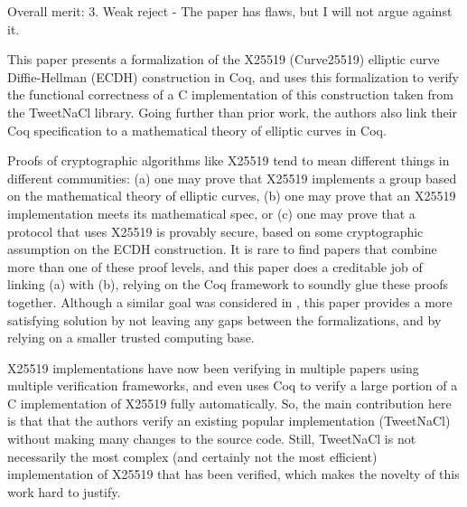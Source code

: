 Overall merit: 3. Weak reject - The paper has flaws, but I will
not argue against it.


\begin{center}
\end{center}

This paper presents a formalization of the X25519
(Curve25519) elliptic curve Diffie-Hellman (ECDH)
construction in Coq, and uses this formalization to verify the
functional correctness of a C implementation of this
construction taken from the TweetNaCl library. Going further than
prior work, the authors also link their Coq specification to a
mathematical theory of elliptic curves in Coq.


\begin{center}
\end{center}

Proofs of cryptographic algorithms like X25519 tend to
mean different things in different communities: (a) one may
prove that X25519 implements a group based on the mathematical
theory of elliptic curves, (b) one may prove that an
X25519 implementation meets its mathematical spec, or (c)
one may prove that a protocol that uses X25519 is provably
secure, based on some cryptographic assumption on the ECDH
construction. It is rare to find papers that combine more than
one of these proof levels, and this paper does a creditable
job of linking (a) with (b), relying on the Coq framework to
soundly glue these proofs together. Although a similar goal
was considered in \cite{Zinzindohoue2016AVE}, this paper provides a more satisfying
solution by not leaving any gaps between the formalizations,
and by relying on a smaller trusted computing base.


\begin{center}
\end{center}

X25519 implementations have now been verifying in multiple
papers using multiple verification frameworks, and \cite{Erbsen2016SystematicSO}
even uses Coq to verify a large portion of a C implementation
of X25519 fully automatically. So, the main contribution
here is that that the authors verify an existing popular
implementation (TweetNaCl) without making many changes to
the source code. Still, TweetNaCl is not necessarily the most
complex (and certainly not the most efficient) implementation
of X25519 that has been verified, which makes the novelty of
this work hard to justify.

